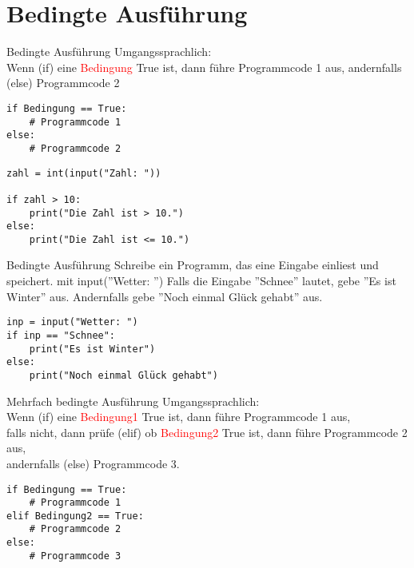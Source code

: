\section{Bedingte Ausführung}

\begin{frame}[fragile]{Bedingte Ausführung}
Umgangssprachlich:\\ Wenn (if) eine \textcolor{red}{Bedingung} True ist, dann führe Programmcode 1 aus, andernfalls (else) Programmcode 2\\

\begin{lstlisting}
if Bedingung == True:
	# Programmcode 1 
else:
	# Programmcode 2 
\end{lstlisting}

\begin{lstlisting}
zahl = int(input("Zahl: "))

if zahl > 10:
	print("Die Zahl ist > 10.")
else:
	print("Die Zahl ist <= 10.")
\end{lstlisting}
\end{frame}

\begin{frame}[fragile]{Bedingte Ausführung}
Schreibe ein Programm, das eine Eingabe einliest und speichert. mit input(''Wetter: '')
Falls die Eingabe ''Schnee'' lautet, gebe ''Es ist Winter'' aus. Andernfalls gebe ''Noch einmal Glück gehabt'' aus.
\pause{}
\begin{lstlisting}
inp = input("Wetter: ")
if inp == "Schnee":
    print("Es ist Winter")
else:
    print("Noch einmal Glück gehabt")
\end{lstlisting}
\end{frame}

\begin{frame}[fragile]{Mehrfach bedingte Ausführung}
Umgangssprachlich:\\ Wenn (if) eine \textcolor{red}{Bedingung1} True ist, dann führe Programmcode 1 aus, \\falls nicht, dann prüfe (elif) ob \textcolor{red}{Bedingung2} True ist, dann führe Programmcode 2 aus, \\andernfalls (else) Programmcode 3.\\

\begin{lstlisting}
if Bedingung == True:
    # Programmcode 1
elif Bedingung2 == True:
    # Programmcode 2
else:
    # Programmcode 3
\end{lstlisting}
\end{frame}


